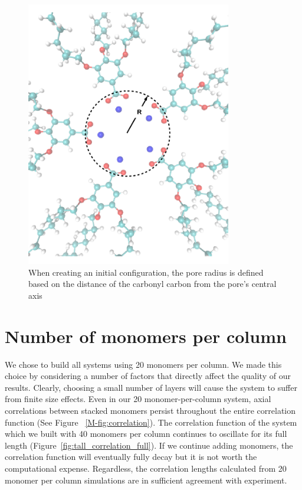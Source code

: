\documentclass[journal=jpcbfk,manusciprt=article]{achemso}
\begin{document}
  \begin{figure}[!htb]
	\centering
	\includegraphics[width=0.8\textwidth]{pore_radius_illustration.png}
	\caption{When creating an initial configuration, the pore radius is defined based
	on the distance of the carbonyl carbon from the pore's central axis}
	\label{fig:pore_radius_illustration}
  \end{figure}

  
  \section{Number of monomers per column}\label{section:monomers_per_column}
  
  We chose to build all systems using 20 monomers per column. We made this choice
  by considering a number of factors that directly affect the quality of our results. 
  Clearly, choosing a small number of layers will cause the system to suffer from 
  finite size effects. Even in our 20 monomer-per-column system, axial correlations
  between stacked monomers persist throughout the entire correlation function (See
  Figure ~\ref{M-fig:correlation}). The correlation function of the system which we
  built with 40 monomers per column continues to oscillate for its full length
  (Figure~\ref{fig:tall_correlation_full}). If we continue adding monomers, the 
  correlation function will eventually fully decay but it is not worth the 
  computational expense. Regardless, the correlation lengths calculated from 20
  monomer per column simulations are in sufficient agreement with experiment. 
  
\end{document}
